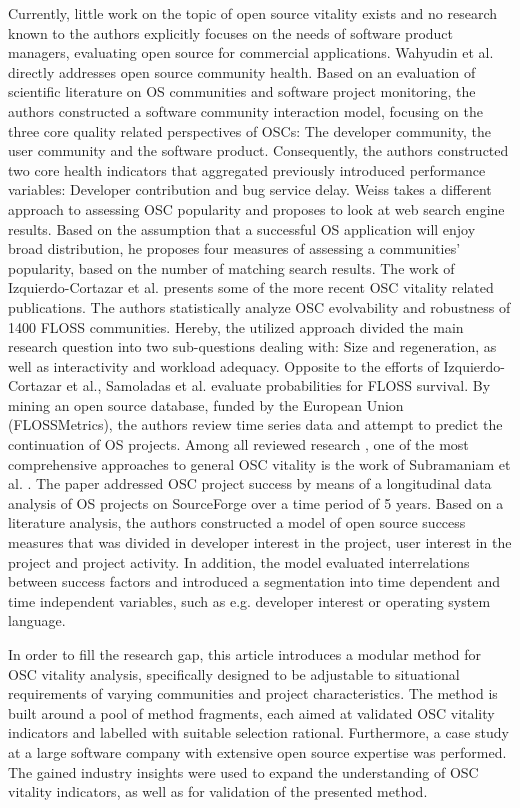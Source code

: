\documentclass[final,5p,times,twocolumn]{elsarticle}
\begin{document}
Currently, little work on the topic of open source vitality exists and no research known to the authors explicitly focuses on the needs of software product managers, evaluating open source for commercial applications. Wahyudin et al. \cite{Wahyudin2007} directly addresses open source community health. Based on an evaluation of scientific literature on OS communities and software project monitoring, the authors constructed a software community interaction model, focusing on the three core quality related perspectives of OSCs: The developer community, the user community and the software product. Consequently, the authors constructed two core health indicators that aggregated previously introduced performance variables: Developer contribution and bug service delay. Weiss \cite{Weiss2005} takes a different approach to assessing OSC popularity and proposes to look at web search engine results. Based on the assumption that a successful OS application will enjoy broad distribution, he proposes four measures of assessing a communities' popularity, based on the number of matching search results. The work of Izquierdo-Cortazar et al.  \cite{Izquierdo-Cortazar2010} presents some of the more recent OSC vitality related publications. The authors statistically analyze OSC evolvability and robustness of 1400 FLOSS communities. Hereby, the utilized approach divided the main research question into two sub-questions dealing with: Size and regeneration, as well as interactivity and workload adequacy. Opposite to the efforts of Izquierdo-Cortazar et al., Samoladas et al. \cite{Samoladas2010} evaluate probabilities for FLOSS survival. By mining an open source database, funded by the European Union (FLOSSMetrics), the authors review time series data and attempt to predict the continuation of OS projects. Among all reviewed research , one of the most comprehensive approaches to general OSC vitality is the work of Subramaniam et al. \cite{Subramaniam2009}. The paper addressed OSC project success by means of a longitudinal data analysis of OS projects on SourceForge over a time period of 5 years. Based on a literature analysis, the authors constructed a model of open source success measures that was divided in developer interest in the project, user interest in the project and project activity. In addition, the model evaluated interrelations between success factors and introduced a segmentation into time dependent and time independent variables, such as e.g. developer interest or operating system language.

In order to fill the research gap, this article introduces a modular method for OSC vitality analysis, specifically designed to be adjustable to situational requirements of varying communities and project characteristics. The method is built around a pool of method fragments, each aimed at validated OSC vitality indicators and labelled with suitable selection rational. Furthermore, a case study at a large software company with extensive open source expertise was performed. The gained industry insights were used to expand the understanding of OSC vitality indicators, as well as for validation of the presented method.
\end{document}
